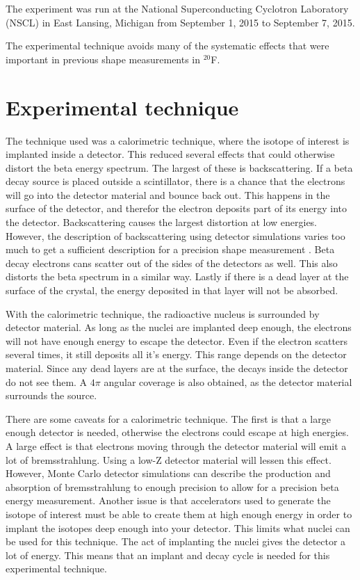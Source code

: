 \documentclass[../MaxHughesThesis.tex]{subfiles}
\begin{document}
The experiment was run at the National Superconducting Cyclotron Laboratory (NSCL) in East Lansing, Michigan from September 1, 2015 to September 7, 2015.

The experimental technique avoids many of the systematic effects that were important in previous shape measurements in  $^{20}$F.

\section{Experimental technique}
The technique used was a calorimetric technique, where the isotope of interest is implanted inside a detector.
This reduced several effects that could otherwise distort the beta energy spectrum.
The largest of these is backscattering.
If a beta decay source is placed outside a scintillator, there is a chance that the electrons will go into the detector material and bounce back out.
This happens in the surface of the detector, and therefor the electron deposits part of its energy into the detector. 
Backscattering causes the largest distortion at low energies.
However, the description of backscattering using detector simulations varies too much to get a sufficient description for a precision shape measurement \cite{Huy18}.
Beta decay electrons cans scatter out of the sides of the detectors as well. 
This also distorts the beta spectrum in a similar way. 
Lastly if there is a dead layer at the surface of the crystal, the energy deposited in that layer will not be absorbed.

With the calorimetric technique, the radioactive nucleus is surrounded by detector material.
As long as the nuclei are implanted deep enough, the electrons will not have enough energy to escape the detector.
Even if the electron scatters several times, it still deposits all it's energy.
This range depends on the detector material.
Since any dead layers are at the surface, the decays inside the detector do not see them.
A $4\pi$ angular coverage is also obtained, as the detector material surrounds the source.

There are some caveats for a calorimetric technique. 
The first is that a large enough detector is needed, otherwise the electrons could escape at high energies.
A large effect is that electrons moving through the detector material will emit a lot of bremsstrahlung.
Using a low-Z detector material will lessen this effect.
However, Monte Carlo detector simulations can describe the production and absorption of bremsstrahlung to enough precision to allow for a precision beta energy measurement. 
Another issue is that accelerators used to generate the isotope of interest must be able to create them at high enough energy in order to implant the isotopes deep enough into your detector.
This limits what nuclei can be used for this technique.
The act of implanting the nuclei gives the detector a lot of energy. 
This means that an implant and decay cycle is needed for this experimental technique.
\end{document}
